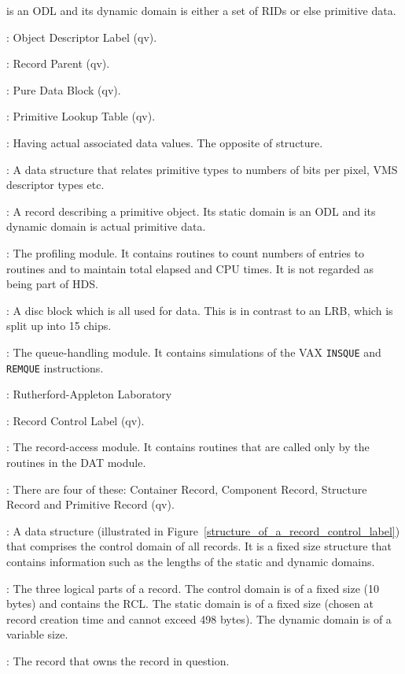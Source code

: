\begin {description}
is an ODL and its dynamic domain is either a set of RIDs or else primitive data.
\item [ODL]: Object Descriptor Label (qv).
\item [Parent]: Record Parent (qv).
\item [PDB]: Pure Data Block (qv).
\item [PLT]: Primitive Lookup Table (qv). 
\item [Primitive]: Having actual associated data values. The opposite of
structure.
\item [Primitive Lookup Table]: A data structure that relates primitive types
to numbers of bits per pixel, VMS descriptor types etc.
\item [Primitive Record]: A record describing a primitive object. Its static
domain is an ODL and its dynamic domain is actual primitive data.
\item [PRO]: The profiling module. It contains routines to count numbers
of entries to routines and to maintain total elapsed and CPU times. It is
not regarded as being part of HDS.
\item [Pure Data Block]: A disc block which is all used for data. This is
in contrast to an LRB, which is split up into 15 chips.
\item [QUE]: The queue-handling module. It contains simulations of the VAX
{\tt INSQUE} and {\tt REMQUE} instructions.
\item [RAL]: Rutherford-Appleton Laboratory
\item [RCL]: Record Control Label (qv).
\item [REC]: The record-access module. It contains routines that are called
only by the routines in the DAT module.
\item [Record Classes]: There are four of these: Container Record, Component
Record, Structure Record and Primitive Record (qv).
\item [Record Control Label]: A data structure (illustrated in
Figure~\ref{structure_of_a_record_control_label}) that comprises the control
domain of all records. It is a fixed size structure that contains information
such as the lengths of the static and dynamic domains.
\item [Record Domains]: The three logical parts of a record. The control
domain is of a fixed size (10 bytes) and contains the RCL. The static domain is 
of a fixed size (chosen at record creation time and cannot exceed 498 bytes).
The dynamic domain is of a variable size.
\item [Record Parent]: The record that owns the record in question.

\end{description}
